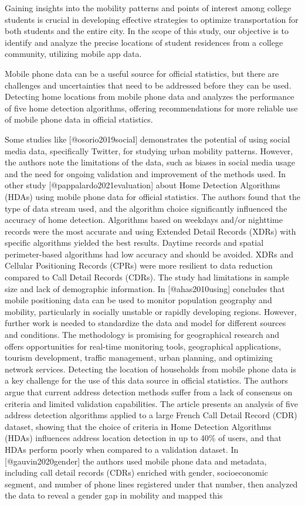 \documentclass[runningheads]{llncs}
\begin{document}
Gaining insights into the mobility patterns and points of interest among college students is crucial in developing effective strategies to optimize transportation for both students and the entire city. In the scope of this study, our objective is to identify and analyze the precise locations of student residences from a college community, utilizing mobile app data.

Mobile phone data can be a useful source for official statistics, but there are challenges and uncertainties that need to be addressed before they can be used. Detecting home locations from mobile phone data and analyzes the performance of five home detection algorithms, offering recommendations for more reliable use of mobile phone data in official statistics.

Some studies like {[}@osorio2019social{]} demonstrates the potential of using social media data, specifically Twitter, for studying urban mobility patterns. However, the authors note the limitations of the data, such as biases in social media usage and the need for ongoing validation and improvement of the methods used. In other study {[}@pappalardo2021evaluation{]} about Home Detection Algorithms (HDAs) using mobile phone data for official statistics. The authors found that the type of data stream used, and the algorithm choice significantly influenced the accuracy of home detection. Algorithms based on weekdays and/or nighttime records were the most accurate and using Extended Detail Records (XDRs) with specific algorithms yielded the best results. Daytime records and spatial perimeter-based algorithms had low accuracy and should be avoided. XDRs and Cellular Positioning Records (CPRs) were more resilient to data reduction compared to Call Detail Records (CDRs). The study had limitations in sample size and lack of demographic information. In {[}@ahas2010using{]} concludes that mobile positioning data can be used to monitor population geography and mobility, particularly in socially unstable or rapidly developing regions. However, further work is needed to standardize the data and model for different sources and conditions. The methodology is promising for geographical research and offers opportunities for real-time monitoring tools, geographical applications, tourism development, traffic management, urban planning, and optimizing network services. Detecting the location of households from mobile phone data is a key challenge for the use of this data source in official statistics. The authors argue that current address detection methods suffer from a lack of consensus on criteria and limited validation capabilities. The article presents an analysis of five address detection algorithms applied to a large French Call Detail Record (CDR) dataset, showing that the choice of criteria in Home Detection Algorithms (HDAs) influences address location detection in up to 40\% of users, and that HDAs perform poorly when compared to a validation dataset. In {[}@gauvin2020gender{]} the authors used mobile phone data and metadata, including call detail records (CDRs) enriched with gender, socioeconomic segment, and number of phone lines registered under that number, then analyzed the data to reveal a gender gap in mobility and mapped this 
\end{document}
